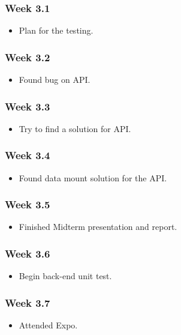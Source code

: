 \documentclass[onecolumn, draftclsnofoot,10pt, compsoc]{article}
\begin{document}
					\subsubsection{Week 3.1}
						\begin{itemize}
						\item Plan for the testing.
						\end{itemize}
					\subsubsection{Week 3.2}
						\begin{itemize}
						\item Found bug on API.
						\end{itemize}
					\subsubsection{Week 3.3}
						\begin{itemize}
						\item Try to find a solution for API.
						\end{itemize}
					\subsubsection{Week 3.4}
						\begin{itemize}
						\item Found data mount solution for the API.
						\end{itemize}
					\subsubsection{Week 3.5}
						\begin{itemize}
						\item Finished Midterm presentation and report.
						\end{itemize}
					\subsubsection{Week 3.6}
						\begin{itemize}
						\item Begin back-end unit test.
						\end{itemize}
					\subsubsection{Week 3.7}
						\begin{itemize}
						\item Attended Expo.
						\end{itemize}
\end{document}
